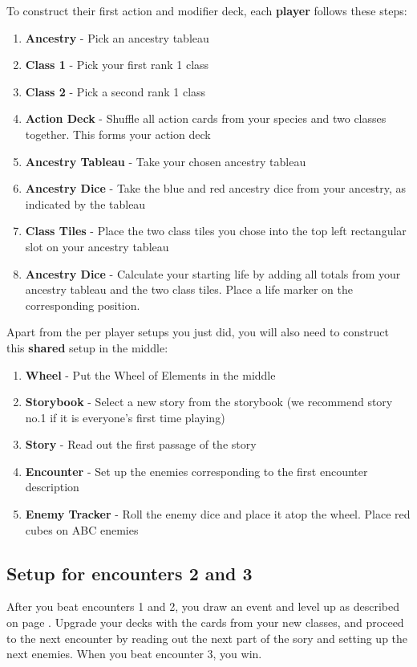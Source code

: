 \begin{minipage}[t][8cm][t]{1\textwidth}
	To construct their first action and modifier deck, each \textbf{player} follows these steps:
	\begin{enumerate}	
		\item \textbf{Ancestry} - Pick an ancestry tableau
		\item \textbf{Class 1} - Pick your first rank 1 class
		\item \textbf{Class 2} - Pick a second rank 1 class
		\item \textbf{Action Deck} - Shuffle all action cards from your species and two classes together. This forms your action deck
		\item \textbf{Ancestry Tableau} - Take your chosen ancestry tableau
		\item \textbf{Ancestry Dice} - Take the blue and red ancestry dice from your ancestry, as indicated by the tableau
		\item \textbf{Class Tiles} - Place the two class tiles you chose into the top left rectangular slot on your ancestry tableau
		\item \textbf{Ancestry Dice} - Calculate your starting life by adding all totals from your ancestry tableau and the two class tiles. Place a life marker on the corresponding position.
	\end{enumerate}
	
	
	\vspace{0.3cm}
	Apart from the per player setups you just did, you will also need to construct this \textbf{shared} setup in the middle:
	\begin{enumerate}
		\item \textbf{Wheel} - Put the Wheel of Elements in the middle
		\item \textbf{Storybook} - Select a new story from the storybook (we recommend story no.1 if it is everyone's first time playing)
		\item \textbf{Story} - Read out the first passage of the story
		\item \textbf{Encounter} - Set up the enemies corresponding to the first encounter description
		\item \textbf{Enemy Tracker} - Roll the enemy dice and place it atop the wheel. Place red cubes on ABC enemies
	\end{enumerate}
\end{minipage}	
\subsection*{Setup for encounters 2 and 3}
After you beat encounters 1 and 2, you draw an event and level up as described on page \pageref{Section_CharacterBuilding}.
Upgrade your decks with the cards from your new classes, and proceed to the next encounter by reading out the next part of the sory and setting up the next enemies.
When you beat encounter 3, you win.
